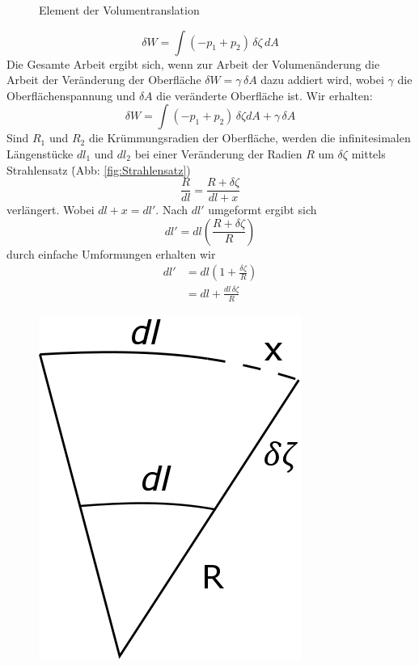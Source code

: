 \begin{refsection}
\begin{figure}
  \caption{Element der Volumentranslation} 
  \label{fig:Volumentransaltion}
\end{figure}
\begin{equation}
\delta W=\int(-p_1+p_2)\,\delta\zeta\,dA
\end{equation}
Die Gesamte Arbeit ergibt sich, wenn zur Arbeit der Volumenänderung die Arbeit der Veränderung der Oberfläche $\delta W=\gamma \, \delta A $ dazu addiert wird, wobei $\gamma$ die Oberflächenspannung und $\delta A$ die veränderte Oberfläche ist. Wir erhalten:
\begin{equation}\label{YL-Arbeit_1}
\delta W=\int(-p_1+p_2)\,\delta\zeta dA + \gamma \,\delta A
\end{equation}
Sind $R_1$ und $R_2$ die Krümmungsradien der Oberfläche, werden die infinitesimalen Längenstücke $dl_1$ und $dl_2$ bei einer Veränderung der Radien $R$ um $\delta\zeta$ mittels Strahlensatz \.(Abb: \ref{fig:Strahlensatz})
\begin{equation}
\frac{R}{dl}=\frac{R+\delta\zeta}{dl+x}
\end{equation}
verlängert. Wobei $dl+x=dl'$. Nach $dl'$ umgeformt ergibt sich
\begin{equation}
dl' = dl(\frac{R+\delta\zeta}{R})
\end{equation}
durch einfache Umformungen erhalten wir
\begin{equation}
\begin{split}
dl' &= dl(1+\frac{\delta\zeta}{R})\\
&=dl+\frac{dl\,\delta\zeta}{R}
\end{split}
\end{equation}
\begin{figure}
  \centering
  \includegraphics[scale=0.3]{minimal/Langenanderung.png}

\end{figure}
\end{refsection}
